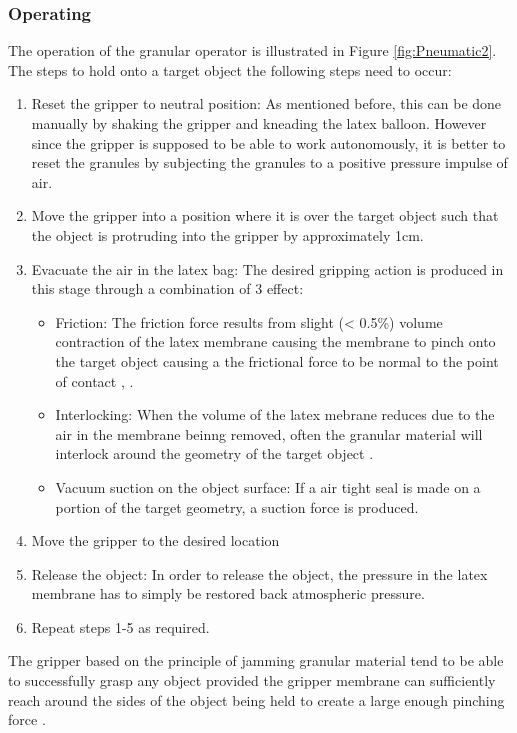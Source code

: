 \documentclass[11pt,twocolumn]{article}
\begin{document}
\subsubsection{Operating }
The operation of the granular operator is illustrated in Figure \ref{fig:Pneumatic2}. The steps to hold onto a target object the following steps need to occur:
\begin{enumerate}
\item Reset the gripper to neutral position: As mentioned before, this can be done manually by shaking the gripper and kneading the latex balloon. However since the gripper is supposed to be able to work autonomously, it is better to reset the granules by subjecting the granules to a positive pressure impulse of air.
\item Move the gripper into a position where it is over the target object such that the object is protruding into the gripper by approximately 1cm.
\item Evacuate the air in the latex bag: The desired gripping action is produced in this stage through a combination of 3 effect:
\begin{itemize}
\item Friction: The friction force results from slight (< 0.5\%) volume contraction of the latex membrane causing the membrane to pinch onto the target object causing a the frictional force to be normal to the point of contact \cite{amend2012positive}, \cite{brown2010universal}.
\item Interlocking: When the volume of the latex mebrane reduces due to the air in the membrane beinng removed, often the granular material will interlock around the geometry of the target object \cite{brown2010universal}.
\item Vacuum suction on the object surface: If a air tight seal is made on a portion of the target geometry, a suction force is produced.
\end{itemize} 
\item Move the gripper to the desired location
\item Release the object: In order to release the object, the pressure in the latex membrane has to simply be restored back atmospheric pressure.
\item Repeat steps 1-5 as required.  
\end{enumerate}
The gripper based on the principle of jamming granular material tend to be able to successfully grasp any object provided the gripper membrane can sufficiently reach around the sides of the object being held to create a large enough pinching force \cite{brown2010universal}. 
\end{document}
